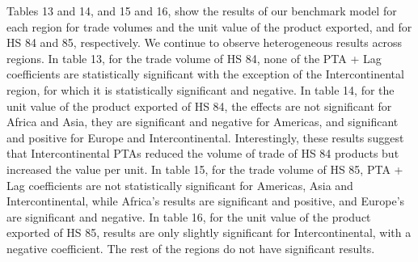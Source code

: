 \documentclass[12pt]{article}%
\begin{document}
Tables 13 and 14, and 15 and 16, show the results of our benchmark model
for each region for trade volumes and the unit value of the product
exported, and for HS 84 and 85, respectively. We continue to observe
heterogeneous results across regions. In table 13, for the trade volume
of HS 84, none of the PTA + Lag coefficients are statistically
significant with the exception of the Intercontinental region, for which
it is statistically significant and negative. In table 14, for the unit
value of the product exported of HS 84, the effects are not significant
for Africa and Asia, they are significant and negative for Americas, and
significant and positive for Europe and Intercontinental. Interestingly,
these results suggest that Intercontinental PTAs reduced the volume of
trade of HS 84 products but increased the value per unit. In table 15,
for the trade volume of HS 85, PTA + Lag coefficients are not
statistically significant for Americas, Asia and Intercontinental, while
Africa's results are significant and positive, and Europe's are
significant and negative. In table 16, for the unit value of the product
exported of HS 85, results are only slightly significant for
Intercontinental, with a negative coefficient. The rest of the regions
do not have significant results.
\end{document}
